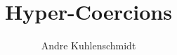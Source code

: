 \documentclass[acmtog, authorversion, acmlarge]{acmart}
\begin{document}
\title{Hyper-Coercions}
\author{Andre Kuhlenschmidt}


\renewcommand\shortauthors{A. Kuhlenschmidt}

\begin{abstract}
\end{abstract}

\maketitle


\newcommand{\T}{\ensuremath{T}}
\newcommand{\B}{\ensuremath{B}}
\newcommand{\I}{\ensuremath{I}}
\newcommand{\Fn}[3][]{\ensuremath{#2 #1 \to #1 #3}}
\newcommand{\Ref}[1]{\ensuremath{\texttt{Ref} \, #1}}
\newcommand{\Integer}{\ensuremath{\texttt{Int}}}
\newcommand{\Bool}{\ensuremath{\texttt{Bool}}}
\newcommand{\Dyn}{\ensuremath{\star}}


\newcommand{\Lbl}{\ensuremath{\ell}}

\newcommand{\Prj}{\ensuremath{p}}
\newcommand{\pmt}{\ensuremath{\id}}
\newcommand{\Med}{\ensuremath{\mu}}
\newcommand{\Inj}{\ensuremath{i}}
\newcommand{\imt}{\ensuremath{\pmt}}
\newcommand{\HC}{\ensuremath{h}}
\newcommand{\hc}[5]{\ensuremath{\, #1 #2 #3 #4 #5 \,}}
\newcommand{\hcfail}[5]{\ensuremath{#1 #2 \failed{#3}{#4}{#5}}}

\newcommand{\prj}[2][]{\ensuremath{#1 ?^{#2}}}
\newcommand{\inj}[1][]{\ensuremath{#1 !}}
\newcommand{\failed}[3]{\ensuremath{\bot^{#1 #2 #3}}}
\newcommand{\id}[1][]{\ensuremath{\iota_{#1}}}
\newcommand{\fn}[3][]{\ensuremath{#2 #1 \to #1 #3}}
\newcommand{\rf}[2]{\ensuremath{\texttt{Ref} \, #1 \, #2}} 

\newcommand{\Crcn}{\ensuremath{c}}
\newcommand{\SE}{\ensuremath{s}}
\newcommand{\Int}{\ensuremath{m}}
\newcommand{\Fnl}{\ensuremath{f}}
\newcommand{\Seq}[2]{\ensuremath{#1 ; #2}}

\newcommand{\sct}[1][\;]{\ensuremath{#1 \overline{\#} #1}}
\newcommand{\sic}[1][\;]{\ensuremath{#1 \# #1}}
\end{document}
